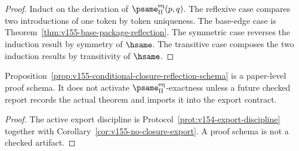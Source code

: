 \begin{proof}
Induct on the derivation of \(\psame_{\Pi}^{\mathrm{eq}}(p,q)\). The reflexive case compares two introductions of one token by token uniqueness. The base-edge case is Theorem~\ref{thm:v155-base-package-reflection}. The symmetric case reverses the induction result by symmetry of \(\hsame\). The transitive case composes the two induction results by transitivity of \(\hsame\).
\end{proof}

\begin{corollary}
\label{cor:v155-closure-still-not-active}
Proposition~\ref{prop:v155-conditional-closure-reflection-schema} is a paper-level proof schema. It does not activate \(\psame_{\Pi}^{\mathrm{eq}}\)-exactness unless a future checked report records the actual theorem and imports it into the export contract.
\end{corollary}

\begin{proof}
The active export discipline is Protocol~\ref{prot:v154-export-discipline} together with Corollary~\ref{cor:v155-no-closure-export}. A proof schema is not a checked artifact.
\end{proof}
